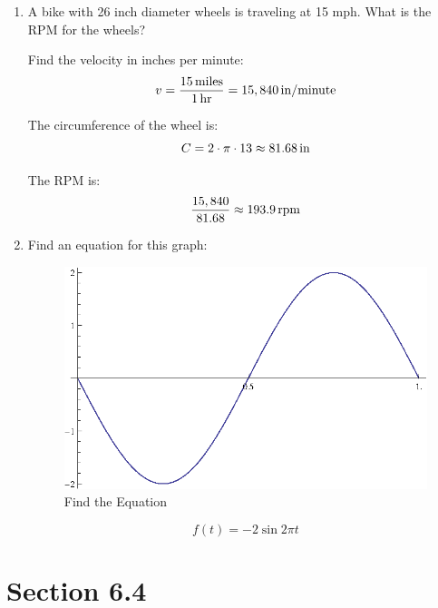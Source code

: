 \documentclass{exam}
\begin{document}
  \begin{enumerate}
    \item A bike with 26 inch diameter wheels is traveling at 15 mph.  What is the RPM for the wheels?
      \begin{solution}
        Find the velocity in inches per minute:
        \[
          v = \frac{\unit[15]{miles}}{\unit[1]{hr}} = \unit[15,840]{in/minute}
        \]

        The circumference of the wheel is:
        \[
          C = 2 \cdot \pi \cdot 13 \approx \unit[81.68]{in}
        \]

        The RPM is:
        \[
          \frac{15,840}{81.68} \approx \unit[193.9]{rpm}
        \]

      \end{solution}

    \item Find an equation for this graph:
      \begin{figure}[h]
        \centering
        \includegraphics[scale=0.7]{review.eps}
        \caption{Find the Equation}
      \end{figure}

      \begin{solution}
        \[
          f(t) = -2 \sin 2 \pi t
        \]
      \end{solution}

  \end{enumerate}
  
  \ifprintanswers

    \section{Section 6.4}
\end{document}
